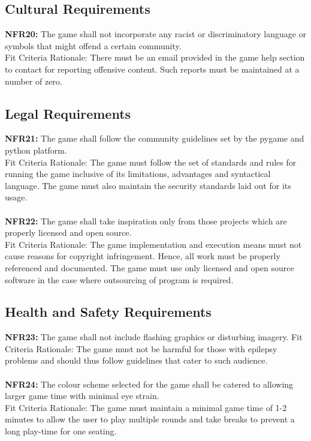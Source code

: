 \documentclass[12pt, titlepage]{article}
\begin{document}
\subsection{Cultural Requirements}
\textbf{NFR20:} The game shall not incorporate any racist or discriminatory language or symbols that might offend a certain community.\\
Fit Criteria Rationale: There must be an email provided in the game help section to contact for reporting offensive content. Such reports must be maintained at a number of zero. \\
\subsection{Legal Requirements}
\textbf{NFR21:} The game shall follow the community guidelines set by the pygame and python platform.\\
Fit Criteria Rationale: The game must follow the set of standards and rules for running the game inclusive of its limitations, advantages and syntactical language. The game must also maintain the security standards laid out for its usage. \\\\
\textbf{NFR22:} The game shall take inspiration only from those projects which are properly licensed and open source.\\
Fit Criteria Rationale: The game implementation and execution means must not cause reasons for copyright infringement. Hence, all work must be properly referenced and documented. The game must use only licensed and open source software in the case where outsourcing of program is required. \\

\subsection{Health and Safety Requirements}
\textbf{NFR23:} The game shall not include flashing graphics or disturbing imagery.
Fit Criteria Rationale: The game must not be harmful for those with epilepsy problems and should thus follow guidelines that cater to such audience.\\\\
\textbf{NFR24:} The colour scheme selected for the game shall be catered to allowing larger game time with minimal eye strain.\\
Fit Criteria Rationale: The game must maintain a minimal game time of 1-2 minutes to allow the user to play multiple rounds and take breaks to prevent a long play-time for one seating. \\
\end{document}
